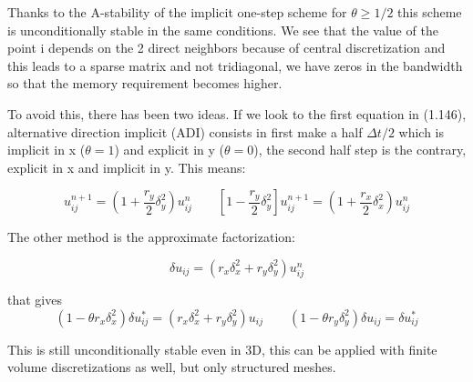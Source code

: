 Thanks to the A-stability of the implicit one-step scheme for $\theta \geq 1/2$ this scheme is unconditionally stable in the same conditions. We see that the value of the point i depends on the 2 direct neighbors because of central discretization and this leads to a sparse matrix and not tridiagonal, we have zeros in the bandwidth so that the memory requirement becomes higher.


To avoid this, there has been two ideas. If we look to the first equation in (1.146), alternative direction implicit (ADI) consists in first make a half $\Delta t/2$ which is implicit in x ($\theta = 1$) and explicit in y ($\theta = 0$), the second half step is the contrary, explicit in x and implicit in y. This means: 

\begin{equation}
[1-\frac{r_x}{2} \delta _x ^2]u_{ij}^{n+1} = (1+\frac{r_y}{2}\delta _y^2)u_{ij}^n \qquad
[1 - \frac{r_y}{2}\delta ^2_y]u_{ij}^{n+1} = (1+\frac{r_x}{2}\delta _x^2)u_{ij}^n
\end{equation}

The other method is the approximate factorization: 

\begin{equation}
[1-\theta r_x \delta _y^2][1-\theta r_y \delta y^2] \delta u_{ij}  = (r_x \delta _x^2+r_y \delta _y^2)u_{ij}^n
\end{equation}

that gives 
\begin{equation}
(1-\theta r_x \delta _x^2)\delta u_{ij}^* = (r_x \delta _x^2 + r_y \delta _y^2)u_{ij}\qquad
(1 - \theta r_y \delta _y ^2)\delta u_{ij} = \delta u_{ij}^*
\end{equation}

This is still unconditionally stable even in 3D, this can be applied with finite volume discretizations as well, but only structured meshes. 